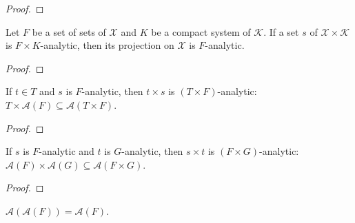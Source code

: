 \begin{proof}\leanok

\end{proof}


\begin{lemma}\label{lem:IsPavingAnalytic.fst}
  \leanok
Let $F$ be a set of sets of $\mathcal{X}$ and $K$ be a compact system of $\mathcal{K}$.
If a set $s$ of $\mathcal{X} \times \mathcal{K}$ is $F \times K$-analytic, then its projection on $\mathcal{X}$ is $F$-analytic.
\end{lemma}

\begin{proof}\leanok

\end{proof}


\begin{lemma}\label{lem:IsPavingAnalytic.prod_left}
  \leanok
If $t \in T$ and $s$ is $F$-analytic, then $t \times s$ is $(T \times F)$-analytic: $T \times \mathcal{A}(F) \subseteq \mathcal{A}(T \times F)$.
\end{lemma}

\begin{proof}\leanok

\end{proof}


\begin{lemma}\label{lem:IsPavingAnalytic.prod}
  \leanok
If $s$ is $F$-analytic and $t$ is $G$-analytic, then $s \times t$ is $(F \times G)$-analytic: $\mathcal{A}(F) \times \mathcal{A}(G) \subseteq \mathcal{A}(F \times G)$.
\end{lemma}

\begin{proof}\leanok

\end{proof}


\begin{lemma}\label{lem:isPavingAnalytic_isPavingAnalytic}
  \leanok
$\mathcal{A}(\mathcal{A}(F)) = \mathcal{A}(F)$.
\end{lemma}

